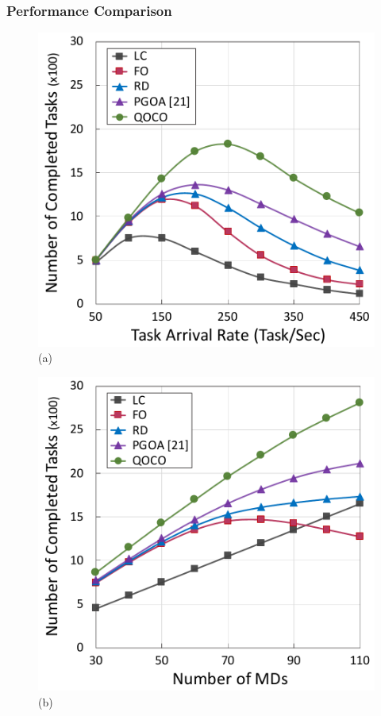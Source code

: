 \begin{frame}
	\frametitle{Performance Comparison}

 \begin{figure}
	\begin{minipage}[b]{0.47\linewidth}
		\centering
		\includegraphics[width=\textwidth]{111} 
       \hspace{0.6cm}(a)
	\end{minipage}
	\hspace{-0.2cm}
	\begin{minipage}[b]{0.47\linewidth}
		\centering
		\includegraphics[width=\textwidth]{112}
       \hspace{0.6cm}(b)
	\end{minipage}


\end{figure}
\end{frame}
